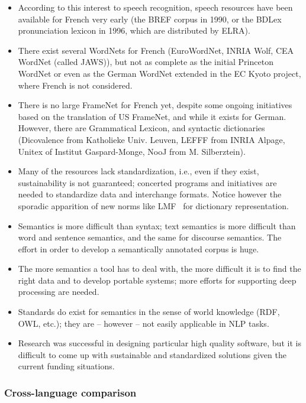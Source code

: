 \begin{multicols}{2}
\begin{itemize}
\item According to this interest to speech recognition, speech resources
have been available for French very early (the BREF corpus in 1990, or
the BDLex pronunciation lexicon in 1996, which are distributed by
ELRA).

\item There exist several WordNets for French (EuroWordNet, INRIA Wolf, CEA
WordNet (called JAWS)), but not as complete as the initial Princeton
WordNet or even as the German WordNet extended in the EC Kyoto
project, where French is not considered.

\item There is no large FrameNet for French yet, despite some ongoing
initiatives based on the translation of US FrameNet, and while it
exists for German. However, there are Grammatical Lexicon, and
syntactic dictionaries (Dicovalence from Katholieke Univ. Leuven,
LEFFF from INRIA Alpage, Unitex of Institut Gaspard-Monge, NooJ from M. Silberztein).

\item Many of the resources lack standardization, i.e., even if they
  exist, sustainability is not guaranteed; concerted programs and
  initiatives are needed to standardize data and interchange
  formats. Notice however the sporadic apparition of new norms like
  LMF~\cite{LMF} for dictionary representation.

\item Semantics is more difficult than syntax; text semantics is more
difficult than word and sentence semantics, and the same for discourse
semantics. The effort in order to develop a semantically annotated
corpus is huge.

\item The more semantics a tool has to deal with, the more difficult it is
to find the right data and to develop portable systems; more efforts
for supporting deep processing are needed.

\item Standards do exist for semantics in the sense of world knowledge (RDF,
OWL, etc.); they are – however – not easily applicable in NLP tasks.

\item Research was successful in designing particular high quality software,
but it is difficult to come up with sustainable and standardized
solutions given the current funding situations.
\end{itemize}

\subsubsection{Cross-language comparison}


\end{multicols}
